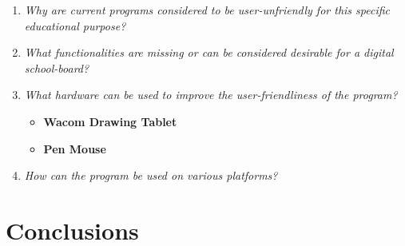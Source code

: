\documentclass[a4paper,12pt]{article}
\begin{document}
\begin{enumerate}
\begin{enumerate}
    \underline{Pros:}\\
    \LaTeX is highly flexible and can be used for simple notes, but also for complex reports and documents. It is capable of displaying mathematical signs and formulas and has great community support. A user can choose a text editor best suited to the needs and wishes of the user.\\
    
    \underline{Cons:}\\
    The learning curve can be especially hard for users with little affinity to coding or markdown languages. Also, if the user encounters an unknown sign, looking for the right keyword can be a lengthy process, which is undesirable for example during classes. Also, free drawing is not supported, which can be difficult in certain educational situations.\\
    
  \end{enumerate}
  
\item \textit{Why are current programs considered to be user-unfriendly for this specific educational purpose?}\\
  
\item \textit{What functionalities are missing or can be considered desirable for a digital school-board?}\\
  
\item \textit{What hardware can be used to improve the user-friendliness of the program?}\\

  \begin{itemize}
  \item \textbf{Wacom Drawing Tablet}
  \item \textbf{Pen Mouse}
  \end{itemize}
  
\item \textit{How can the program be used on various platforms?}\\
  
\end{enumerate}

\section{Conclusions}
\end{document}
